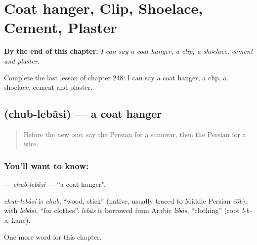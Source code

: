 
\chapter{Coat hanger, Clip, Shoelace, Cement, Plaster}
\label{ch:fa-coat-hanger-clip-shoelace-cement-plaster}

\begin{chapteropening}
\textbf{By the end of this chapter:} \emph{I can say a coat hanger, a clip, a shoelace, cement and plaster.}

Complete the last lesson of chapter 248: I can say a coat hanger, a clip, a shoelace, cement and plaster.
\end{chapteropening}

\section[\texorpdfstring{\fa{چوب} \fa{لباسی} (chub-lebâsi)}{چوب لباسی (chub-lebâsi)}]{  (chub-lebâsi) — a coat hanger}

\label{lesson:FA-C248-chub-lebasi}



\begin{quote}
Before the new one: say the Persian for a samovar, then the Persian for a wire.
\end{quote}

\subsection*{You'll want to know:  }
\textbf{ } — \emph{chub-lebâsi} — \textquotedblleft{}a coat hanger\textquotedblright{}.

\begin{cousinweb}
\emph{chub-lebâsi} is \emph{chub}, \textquotedblleft{}wood, stick\textquotedblright{} (native, usually traced to Middle Persian \emph{čōb}), with \emph{lebâsi}, \textquotedblleft{}for clothes\textquotedblright{}. \emph{lebâs} is borrowed from Arabic \emph{libās}, \textquotedblleft{}clothing\textquotedblright{} (root \emph{l-b-s}, Lane).
\end{cousinweb}

\begin{grammarlens}[title={What you've built}]
One more word for this chapter.
\end{grammarlens}

